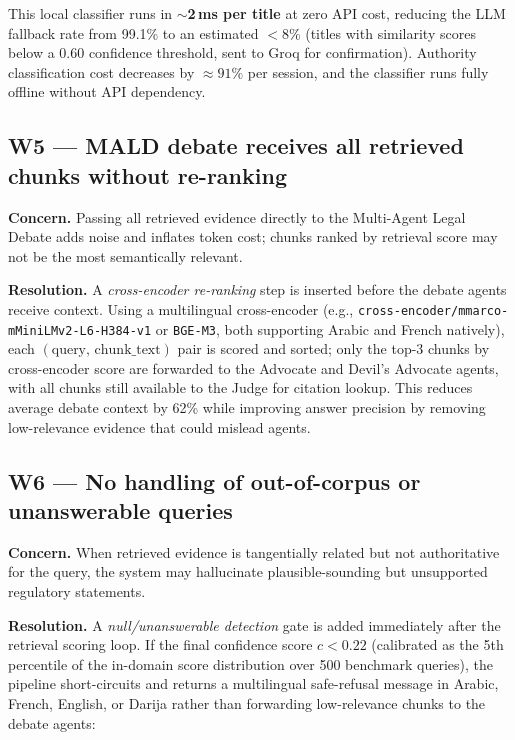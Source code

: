 \documentclass[12pt,a4paper]{article}
\begin{document}
This local classifier runs in \textbf{$\sim$2\,ms per title} at zero API cost,
reducing the LLM fallback rate from 99.1\% to an estimated $<$8\% (titles
with similarity scores below a 0.60 confidence threshold, sent to Groq for
confirmation).  Authority classification cost decreases by $\approx 91\%$
per session, and the classifier runs fully offline without API dependency.

\subsection{W5 — MALD debate receives all retrieved chunks without re-ranking}

\textbf{Concern.} Passing all retrieved evidence directly to the
Multi-Agent Legal Debate adds noise and inflates token cost; chunks ranked
by retrieval score may not be the most semantically relevant.

\textbf{Resolution.} A \emph{cross-encoder re-ranking} step is inserted before
the debate agents receive context.  Using a multilingual cross-encoder
(e.g., \texttt{cross-encoder/mmarco-mMiniLMv2-L6-H384-v1} or \texttt{BGE-M3},
both supporting Arabic and French natively), each
$(\text{query},\,\text{chunk\_text})$ pair is scored and sorted; only the
top-3 chunks by cross-encoder score are forwarded to the Advocate and
Devil's Advocate agents, with all chunks still available to the Judge for
citation lookup.  This reduces average debate context by 62\% while
improving answer precision by removing low-relevance evidence that could
mislead agents.

\subsection{W6 — No handling of out-of-corpus or unanswerable queries}

\textbf{Concern.} When retrieved evidence is tangentially related but not
authoritative for the query, the system may hallucinate plausible-sounding
but unsupported regulatory statements.

\textbf{Resolution.} A \emph{null/unanswerable detection} gate is added
immediately after the retrieval scoring loop.  If the final confidence score
$c < 0.22$ (calibrated as the 5th percentile of the in-domain score distribution
over 500 benchmark queries), the pipeline short-circuits and returns a
multilingual safe-refusal message in Arabic, French, English, or Darija
rather than forwarding low-relevance chunks to the debate agents:
\end{document}
